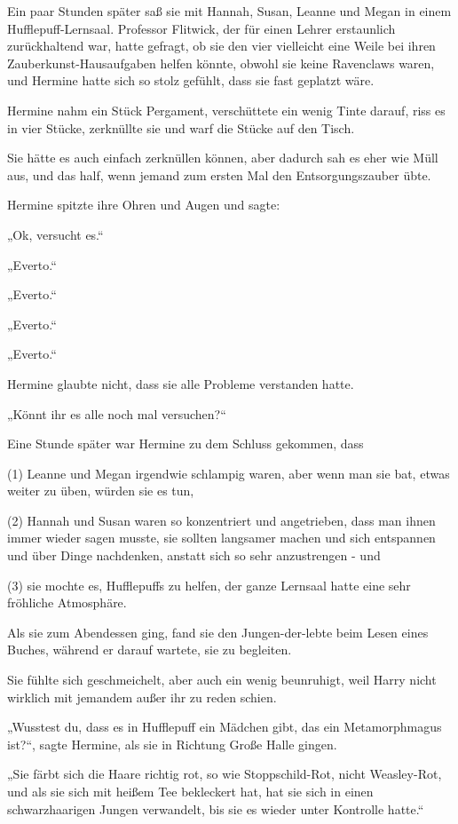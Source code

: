 {Ein paar Stunden später saß sie mit Hannah, Susan, Leanne und Megan in einem Hufflepuff-Lernsaal. Professor Flitwick, der für einen Lehrer erstaunlich zurückhaltend war, hatte gefragt, ob sie den vier vielleicht eine Weile bei ihren Zauberkunst-Hausaufgaben helfen könnte, obwohl sie keine Ravenclaws waren, und Hermine hatte sich so stolz gefühlt, dass sie fast geplatzt wäre.

Hermine nahm ein Stück Pergament, verschüttete ein wenig Tinte darauf, riss es in vier Stücke, zerknüllte sie und warf die Stücke auf den Tisch.

Sie hätte es auch einfach zerknüllen können, aber dadurch sah es eher wie Müll aus, und das half, wenn jemand zum ersten Mal den Entsorgungszauber übte.

Hermine spitzte ihre Ohren und Augen und sagte:

„Ok, versucht es.“

„Everto.“

„Everto.“

„Everto.“

„Everto.“

Hermine glaubte nicht, dass sie alle Probleme verstanden hatte.

„Könnt ihr es alle noch mal versuchen?“

Eine Stunde später war Hermine zu dem Schluss gekommen, dass

(1) Leanne und Megan irgendwie schlampig waren, aber wenn man sie bat, etwas weiter zu üben, würden sie es tun,

(2) Hannah und Susan waren so konzentriert und angetrieben, dass man ihnen immer wieder sagen musste, sie sollten langsamer machen und sich entspannen und über Dinge nachdenken, anstatt sich so sehr anzustrengen - und

(3) sie mochte es, Hufflepuffs zu helfen, der ganze Lernsaal hatte eine sehr fröhliche Atmosphäre.

Als sie zum Abendessen ging, fand sie den Jungen-der-lebte beim Lesen eines Buches, während er darauf wartete, sie zu begleiten.

Sie fühlte sich geschmeichelt, aber auch ein wenig beunruhigt, weil Harry nicht wirklich mit jemandem außer ihr zu reden schien.

„Wusstest du, dass es in Hufflepuff ein Mädchen gibt, das ein Metamorphmagus ist?“, sagte Hermine, als sie in Richtung Große Halle gingen.

„Sie färbt sich die Haare richtig rot, so wie Stoppschild-Rot, nicht Weasley-Rot, und als sie sich mit heißem Tee bekleckert hat, hat sie sich in einen schwarzhaarigen Jungen verwandelt, bis sie es wieder unter Kontrolle hatte.“

}
